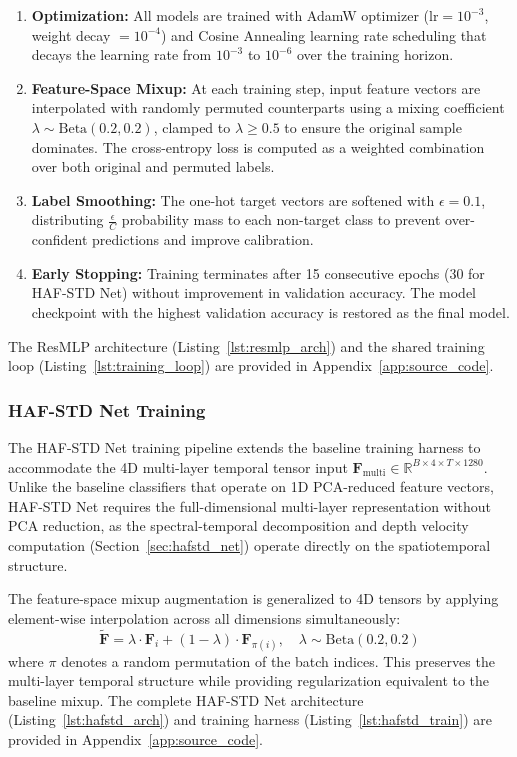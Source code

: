 \begin{enumerate}[leftmargin=*]
    \item \textbf{Optimization:} All models are trained with AdamW optimizer ($\text{lr} = 10^{-3}$, weight decay $= 10^{-4}$) and Cosine Annealing learning rate scheduling that decays the learning rate from $10^{-3}$ to $10^{-6}$ over the training horizon.
    
    \item \textbf{Feature-Space Mixup:} At each training step, input feature vectors are interpolated with randomly permuted counterparts using a mixing coefficient $\lambda \sim \text{Beta}(0.2, 0.2)$, clamped to $\lambda \geq 0.5$ to ensure the original sample dominates. The cross-entropy loss is computed as a weighted combination over both original and permuted labels.
    
    \item \textbf{Label Smoothing:} The one-hot target vectors are softened with $\epsilon = 0.1$, distributing $\frac{\epsilon}{C}$ probability mass to each non-target class to prevent over-confident predictions and improve calibration.
    
    \item \textbf{Early Stopping:} Training terminates after 15 consecutive epochs (30 for HAF-STD Net) without improvement in validation accuracy. The model checkpoint with the highest validation accuracy is restored as the final model.
\end{enumerate}

The ResMLP architecture (Listing~\ref{lst:resmlp_arch}) and the shared training loop (Listing~\ref{lst:training_loop}) are provided in Appendix~\ref{app:source_code}.

\subsubsection{HAF-STD Net Training}

The HAF-STD Net training pipeline extends the baseline training harness to accommodate the 4D multi-layer temporal tensor input $\mathbf{F}_{\text{multi}} \in \mathbb{R}^{B \times 4 \times T \times 1280}$. Unlike the baseline classifiers that operate on 1D PCA-reduced feature vectors, HAF-STD Net requires the full-dimensional multi-layer representation without PCA reduction, as the spectral-temporal decomposition and depth velocity computation (Section~\ref{sec:hafstd_net}) operate directly on the spatiotemporal structure.

The feature-space mixup augmentation is generalized to 4D tensors by applying element-wise interpolation across all dimensions simultaneously:
\begin{equation}
    \tilde{\mathbf{F}} = \lambda \cdot \mathbf{F}_i + (1 - \lambda) \cdot \mathbf{F}_{\pi(i)}, \quad \lambda \sim \text{Beta}(0.2, 0.2)
\end{equation}
where $\pi$ denotes a random permutation of the batch indices. This preserves the multi-layer temporal structure while providing regularization equivalent to the baseline mixup. The complete HAF-STD Net architecture (Listing~\ref{lst:hafstd_arch}) and training harness (Listing~\ref{lst:hafstd_train}) are provided in Appendix~\ref{app:source_code}.


